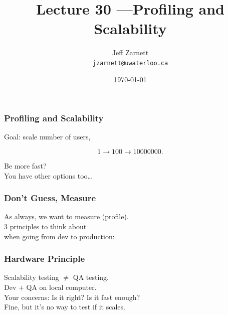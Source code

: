 

\title{Lecture 30 ---Profiling and Scalability}

\author{Jeff Zarnett\\ \small \texttt{jzarnett@uwaterloo.ca}}
\date{\today}




\begin{frame}
  \titlepage

 \end{frame}



\begin{frame}
\frametitle{Profiling and Scalability}

\Large
\begin{changemargin}{2cm}
Goal: scale number of users,

\[ 1 \rightarrow 100 \rightarrow 10 000 000. \]

Be more fast? \\
You have other options too\ldots
\end{changemargin}

\end{frame}


\begin{frame}
\frametitle{Don't Guess, Measure}

\large
\begin{changemargin}{2cm}
As always, we want to measure (profile).\\[1em]
3 principles to think about\\
when going from dev to production:
\end{changemargin}

\end{frame}



\begin{frame}
\frametitle{Hardware Principle}

\large
\begin{changemargin}{2cm}
Scalability testing $\neq$  QA testing.\\[1em]

Dev + QA on local computer.\\
Your concerns: Is it right? Is it fast enough?\\[1em]

Fine, but it's no way to test if it scales. 
\end{changemargin}

\end{frame}



